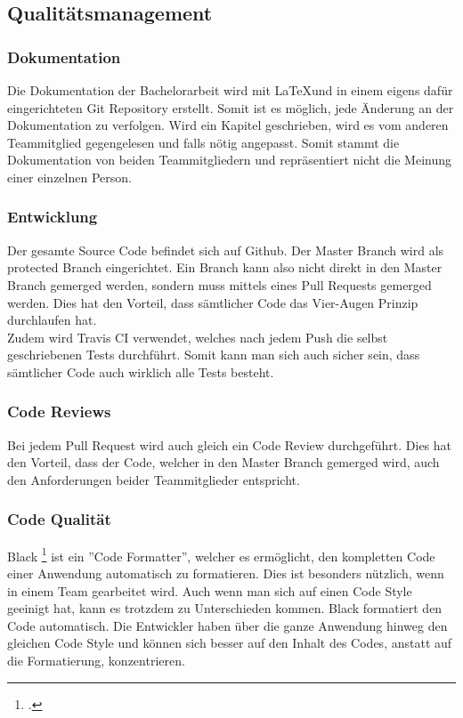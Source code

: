 \subsection{Qualitätsmanagement}

\subsubsection*{Dokumentation}
Die Dokumentation der Bachelorarbeit wird mit \LaTeX und in einem eigens dafür eingerichteten Git Repository erstellt. Somit ist es möglich, jede Änderung an der Dokumentation zu verfolgen. Wird ein Kapitel geschrieben, wird es vom anderen Teammitglied gegengelesen und falls nötig angepasst. Somit stammt die Dokumentation von beiden Teammitgliedern und repräsentiert nicht die Meinung einer einzelnen Person. 


\subsubsection*{Entwicklung}
Der gesamte Source Code befindet sich auf Github. Der Master Branch wird als protected Branch eingerichtet. Ein Branch kann also nicht direkt in den Master Branch gemerged werden, sondern muss mittels eines Pull Requests gemerged werden. Dies hat den Vorteil, dass sämtlicher Code das Vier-Augen Prinzip durchlaufen hat. \\ 
Zudem wird Travis CI verwendet, welches nach jedem Push die selbst geschriebenen Tests durchführt. Somit kann man sich auch sicher sein, dass sämtlicher Code auch wirklich alle Tests besteht.

\subsubsection*{Code Reviews}
Bei jedem Pull Request wird auch gleich ein Code Review durchgeführt. Dies hat den Vorteil, dass der Code, welcher in den Master Branch gemerged wird, auch den Anforderungen beider Teammitglieder entspricht.

\subsubsection*{Code Qualität}
Black \footcite{black} ist ein ''Code Formatter'', welcher es ermöglicht, den kompletten Code einer Anwendung automatisch zu formatieren. Dies ist besonders nützlich, wenn in einem Team gearbeitet wird. Auch wenn man sich auf einen Code Style geeinigt hat, kann es trotzdem zu Unterschieden kommen.
Black formatiert den Code automatisch. Die Entwickler haben über die ganze Anwendung hinweg den gleichen Code Style und können sich besser auf den Inhalt des Codes, anstatt auf die Formatierung, konzentrieren.\\

